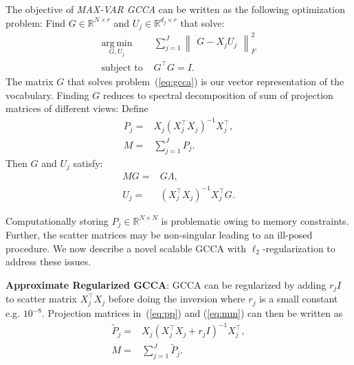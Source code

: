 \documentclass[11pt]{article}
\begin{document}
The objective of \emph{MAX-VAR GCCA} can be written as the following optimization problem:
 Find $G \in \mathbb{R}^{N\times r}$ and $U_j \in
\mathbb{R}^{d_j \times r}$ that solve:
\begin{equation}
  \label{eq:gcca}
\begin{split}
  \operatorname*{\arg\,\min}_{G,U_j} & \sum_{j=1}^J \begin{Vmatrix} G - X_jU_j \end{Vmatrix}^2_F \\
  \text{subject to } & G^\top G = I.
\end{split}
\end{equation}
The matrix $G$ that solves problem~(\ref{eq:gcca}) is our vector representation of the vocabulary. Finding $G$ reduces to spectral decomposition of sum of projection matrices of different views: Define
\begin{align}
P_j =& X_j(X_j^\top X_j)^{-1}X_j^\top, \label{eq:pp}\\
M =& \sum_{j=1}^J P_j. \label{eq:mm}
\end{align}
Then $G$ and $U_j$ satisfy:
\begin{align}
M G =& G \Lambda,\\
U_j =& \left(X_j^\top X_j\right)^{-1} X_j^\top G.
\end{align}


Computationally storing $P_j \in \mathbb{R}^{N \times N}$ is
problematic owing to memory constraints.  Further, the scatter
matrices may be non-singular leading to an ill-posed procedure.
We now describe a novel scalable GCCA with $\ell_2$-regularization to address these issues. 

\noindent\textbf{Approximate Regularized GCCA}: GCCA can be regularized by adding $r_jI$ to 
scatter matrix $X_j^\top X_j$ before doing the inversion where
$r_j$ is a small constant e.g. $10^{-8}$. 
Projection matrices in~(\ref{eq:pp}) and (\ref{eq:mm}) can then be written as
\begin{align}
  \widetilde{P}_{j} =& X_j(X_j^\top X_j+r_jI)^{-1}X_j^\top, \label{eq:6}\\
  M =& \sum_{j=1}^J \widetilde{P}_{j}. \label{eq:mmm}
\end{align}
\end{document}

